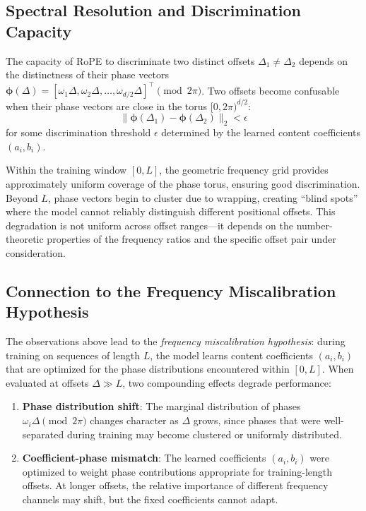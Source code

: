 \documentclass[conference]{IEEEtran}
\begin{document}
\subsection{Spectral Resolution and Discrimination Capacity}
The capacity of RoPE to discriminate two distinct offsets $\Delta_1 \neq \Delta_2$ depends on the distinctness of their phase vectors $\boldsymbol{\phi}(\Delta) = [\omega_1 \Delta, \omega_2 \Delta, \ldots, \omega_{d/2} \Delta]^\top \pmod{2\pi}$. Two offsets become confusable when their phase vectors are close in the torus $[0, 2\pi)^{d/2}$:
\begin{equation}
\|\boldsymbol{\phi}(\Delta_1) - \boldsymbol{\phi}(\Delta_2)\|_2 < \epsilon
\end{equation}
for some discrimination threshold $\epsilon$ determined by the learned content coefficients $(a_i, b_i)$.

Within the training window $[0, L]$, the geometric frequency grid provides approximately uniform coverage of the phase torus, ensuring good discrimination. Beyond $L$, phase vectors begin to cluster due to wrapping, creating ``blind spots'' where the model cannot reliably distinguish different positional offsets. This degradation is not uniform across offset ranges---it depends on the number-theoretic properties of the frequency ratios and the specific offset pair under consideration.

\subsection{Connection to the Frequency Miscalibration Hypothesis}
The observations above lead to the \emph{frequency miscalibration hypothesis}: during training on sequences of length $L$, the model learns content coefficients $(a_i, b_i)$ that are optimized for the phase distributions encountered within $[0, L]$. When evaluated at offsets $\Delta \gg L$, two compounding effects degrade performance:

\begin{enumerate}
\item \textbf{Phase distribution shift}: The marginal distribution of phases $\omega_i \Delta \pmod{2\pi}$ changes character as $\Delta$ grows, since phases that were well-separated during training may become clustered or uniformly distributed.
\item \textbf{Coefficient-phase mismatch}: The learned coefficients $(a_i, b_i)$ were optimized to weight phase contributions appropriate for training-length offsets. At longer offsets, the relative importance of different frequency channels may shift, but the fixed coefficients cannot adapt.
\end{enumerate}
\end{document}
